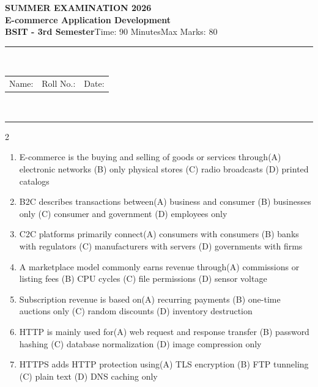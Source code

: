 \documentclass[a4paper]{article}
\makeatletter
\newcommand{\examheader}{%
\begin{center}\textbf{\large SUMMER EXAMINATION 2026}\\[-1pt]
\textbf{\normalsize E-commerce Application Development}\\[-1pt]
\textbf{BSIT - 3rd Semester}\quad Time: 90 Minutes\quad Max Marks: 80\\[-1pt]
\textcolor{black!65}{\rule{\linewidth}{0.45pt}}\\[-2pt]
\begin{tabularx}{\linewidth}{@{}X X X@{}}Name: \hrulefill & Roll No.: \hrulefill & Date: \hrulefill\end{tabularx}\\[-1pt]
\textcolor{black!65}{\rule{\linewidth}{0.45pt}}\end{center}}
\makeatother
\begin{document}
\examheader
\raggedcolumns
\begin{multicols*}{2}
\fontsize{8.5}{10}\selectfont
\begin{enumerate}
\item E-commerce is the buying and selling of goods or services through\newline\hspace*{0.6em}(A) electronic networks \quad (B) only physical stores \newline\hspace*{0.6em}(C) radio broadcasts \quad (D) printed catalogs
\item B2C describes transactions between\newline\hspace*{0.6em}(A) business and consumer \quad (B) businesses only \newline\hspace*{0.6em}(C) consumer and government \quad (D) employees only
\item C2C platforms primarily connect\newline\hspace*{0.6em}(A) consumers with consumers \quad (B) banks with regulators \newline\hspace*{0.6em}(C) manufacturers with servers \quad (D) governments with firms
\item A marketplace model commonly earns revenue through\newline\hspace*{0.6em}(A) commissions or listing fees \quad (B) CPU cycles \newline\hspace*{0.6em}(C) file permissions \quad (D) sensor voltage
\item Subscription revenue is based on\newline\hspace*{0.6em}(A) recurring payments \quad (B) one-time auctions only \newline\hspace*{0.6em}(C) random discounts \quad (D) inventory destruction
\item HTTP is mainly used for\newline\hspace*{0.6em}(A) web request and response transfer \quad (B) password hashing \newline\hspace*{0.6em}(C) database normalization \quad (D) image compression only
\item HTTPS adds HTTP protection using\newline\hspace*{0.6em}(A) TLS encryption \quad (B) FTP tunneling \newline\hspace*{0.6em}(C) plain text \quad (D) DNS caching only

\end{enumerate}
\end{multicols*}
\end{document}
